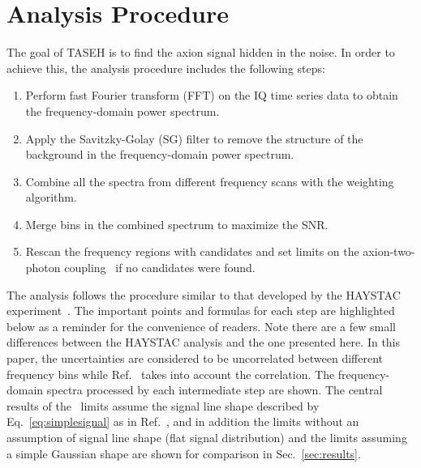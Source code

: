 \section{Analysis Procedure} \label{sec:ana}
The goal of TASEH is to find the axion signal hidden in the noise. In 
order to achieve this, the analysis procedure includes the following steps:
    \begin{enumerate}
        \item Perform fast Fourier transform (FFT) on the 
IQ time series data to obtain the frequency-domain power spectrum.
        \item Apply the Savitzky-Golay (SG) filter to remove the structure 
of the background in the frequency-domain power spectrum.
        \item Combine all the spectra from different frequency scans with 
the weighting algorithm.
        \item Merge bins in the combined spectrum to maximize the SNR. 
       \item Rescan the frequency regions with candidates and set limits on 
      the axion-two-photon coupling \gagg\ if no candidates were found.
    \end{enumerate}

    The analysis follows the procedure similar to that 
developed by the HAYSTAC experiment~\cite{HAYSTACII}. The important points  
and formulas for each step are highlighted below as a reminder 
for the convenience of readers. Note there are a few  
small differences between the HAYSTAC analysis and the one presented here. 
In this paper, the uncertainties are considered to be uncorrelated between 
different frequency bins while Ref.~\cite{HAYSTACII} takes into account 
the correlation. The frequency-domain spectra processed by each intermediate 
step are shown. The central results of the \gagg\ limits assume the signal 
line shape described by Eq.~\eqref{eq:simplesignal} as in Ref.~\cite{HAYSTACII}, and 
in addition the limits without an assumption of signal line shape (flat 
signal distribution) and the limits assuming a simple Gaussian shape are 
shown for comparison in Sec.~\ref{sec:results}.

